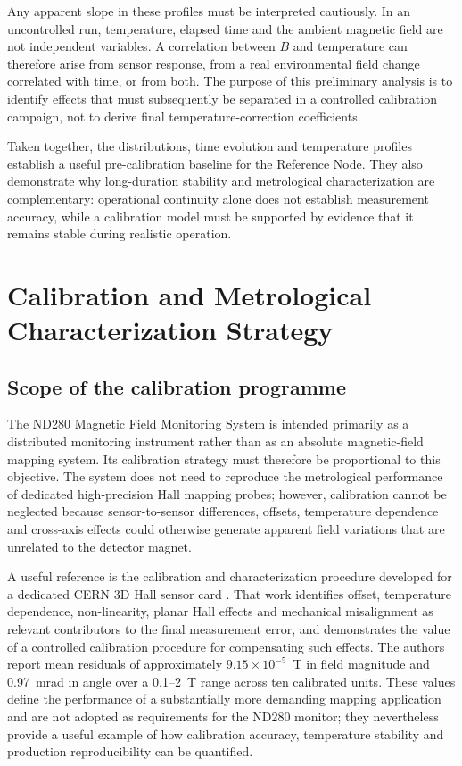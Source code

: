 Any apparent slope in these profiles must be interpreted cautiously. In an uncontrolled run, temperature, elapsed time and the ambient magnetic field are not independent variables. A correlation between $B$ and temperature can therefore arise from sensor response, from a real environmental field change correlated with time, or from both. The purpose of this preliminary analysis is to identify effects that must subsequently be separated in a controlled calibration campaign, not to derive final temperature-correction coefficients.

Taken together, the distributions, time evolution and temperature profiles establish a useful pre-calibration baseline for the Reference Node. They also demonstrate why long-duration stability and metrological characterization are complementary: operational continuity alone does not establish measurement accuracy, while a calibration model must be supported by evidence that it remains stable during realistic operation.

\section{Calibration and Metrological Characterization Strategy}

\subsection{Scope of the calibration programme}

The ND280 Magnetic Field Monitoring System is intended primarily as a distributed monitoring instrument rather than as an absolute magnetic-field mapping system. Its calibration strategy must therefore be proportional to this objective. The system does not need to reproduce the metrological performance of dedicated high-precision Hall mapping probes; however, calibration cannot be neglected because sensor-to-sensor differences, offsets, temperature dependence and cross-axis effects could otherwise generate apparent field variations that are unrelated to the detector magnet.

A useful reference is the calibration and characterization procedure developed for a dedicated CERN 3D Hall sensor card \cite{MessnerHallCalibration}. That work identifies offset, temperature dependence, non-linearity, planar Hall effects and mechanical misalignment as relevant contributors to the final measurement error, and demonstrates the value of a controlled calibration procedure for compensating such effects. The authors report mean residuals of approximately $9.15\times10^{-5}$~T in field magnitude and 0.97~mrad in angle over a 0.1--2~T range across ten calibrated units. These values define the performance of a substantially more demanding mapping application and are not adopted as requirements for the ND280 monitor; they nevertheless provide a useful example of how calibration accuracy, temperature stability and production reproducibility can be quantified.

